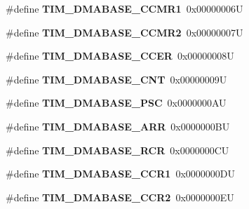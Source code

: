 \begin{DoxyCompactItemize}
\#define {\bfseries T\+I\+M\+\_\+\+D\+M\+A\+B\+A\+S\+E\+\_\+\+C\+C\+M\+R1}~0x00000006U
\item 
\mbox{\label{group___t_i_m___d_m_a___base__address_ga94f3dcf13674f397fee0ef816ad973cf}} 
\#define {\bfseries T\+I\+M\+\_\+\+D\+M\+A\+B\+A\+S\+E\+\_\+\+C\+C\+M\+R2}~0x00000007U
\item 
\mbox{\label{group___t_i_m___d_m_a___base__address_ga64cb24a6d9d96d950be64586923c7447}} 
\#define {\bfseries T\+I\+M\+\_\+\+D\+M\+A\+B\+A\+S\+E\+\_\+\+C\+C\+ER}~0x00000008U
\item 
\mbox{\label{group___t_i_m___d_m_a___base__address_gae711483dbf4f0eafb2505b8f823c4724}} 
\#define {\bfseries T\+I\+M\+\_\+\+D\+M\+A\+B\+A\+S\+E\+\_\+\+C\+NT}~0x00000009U
\item 
\mbox{\label{group___t_i_m___d_m_a___base__address_gae23315a3ef1af7dccfbbfada90355bd8}} 
\#define {\bfseries T\+I\+M\+\_\+\+D\+M\+A\+B\+A\+S\+E\+\_\+\+P\+SC}~0x0000000\+AU
\item 
\mbox{\label{group___t_i_m___d_m_a___base__address_ga3e08cd689d59f76dd5ca958a0ffdfb3d}} 
\#define {\bfseries T\+I\+M\+\_\+\+D\+M\+A\+B\+A\+S\+E\+\_\+\+A\+RR}~0x0000000\+BU
\item 
\mbox{\label{group___t_i_m___d_m_a___base__address_gac26cff34f1d207798b946c01a40f5d89}} 
\#define {\bfseries T\+I\+M\+\_\+\+D\+M\+A\+B\+A\+S\+E\+\_\+\+R\+CR}~0x0000000\+CU
\item 
\mbox{\label{group___t_i_m___d_m_a___base__address_ga2d1bc7e5ae83b91caa352276d15142dc}} 
\#define {\bfseries T\+I\+M\+\_\+\+D\+M\+A\+B\+A\+S\+E\+\_\+\+C\+C\+R1}~0x0000000\+DU
\item 
\mbox{\label{group___t_i_m___d_m_a___base__address_ga0c73e7e1fa212ab14a43ca49e9d8850e}} 
\#define {\bfseries T\+I\+M\+\_\+\+D\+M\+A\+B\+A\+S\+E\+\_\+\+C\+C\+R2}~0x0000000\+EU
\item 
\mbox{\label{group___t_i_m___d_m_a___base__address_gae3c259f405c78e31411c19195eac48bc}} 

\end{DoxyCompactItemize}
